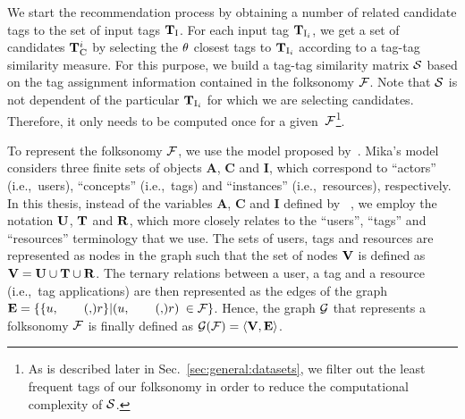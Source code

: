 We start the recommendation process by obtaining a number of related candidate tags to the set of input tags $\mathbf{T}_{\text{I}}$. 
For each input tag $\mathbf{T}_{\text{I}_i}$, we get a set of candidates $\mathbf{T}_{\text{C}}^i$ by selecting the $\theta$ closest tags to $\mathbf{T}_{\text{I}_i}$ according to a tag-tag similarity measure. For this purpose, we build a tag-tag similarity matrix $\mathcal{S}$ based on the tag assignment information contained in the folksonomy $\mathcal{F}$. Note that $\mathcal{S}$ is not dependent of the particular $\mathbf{T}_{\text{I}_i}$ for which we are selecting candidates. Therefore, it only needs to be computed once for a given~$\mathcal{F}$\footnote{As is described later in Sec.~\ref{sec:general:datasets}, we filter out the least frequent tags of our folksonomy in order to reduce the computational complexity of $\mathcal{S}$.}. 

To represent the folksonomy $\mathcal{F}$, we use the model proposed by~\cite{Mika2007a}. Mika's model considers three finite sets of objects $\mathbf{A}$, $\mathbf{C}$ and $\mathbf{I}$, which correspond to ``actors'' (i.e.,~users), ``concepts'' (i.e.,~tags) and ``instances'' (i.e.,~resources), respectively. In this thesis, instead of the variables $\mathbf{A}$, $\mathbf{C}$ and $\mathbf{I}$ defined by ~\cite{Mika2007a}, we employ the notation $\mathbf{U}$, $\mathbf{T}$ and $\mathbf{R}$, which more closely relates to the ``users'', ``tags'' and ``resources'' terminology that we use.
The sets of users, tags and resources are represented as nodes in the graph such that the set of nodes $\mathbf{V}$ is defined as $\mathbf{V}=\mathbf{U}\cup \mathbf{T}\cup \mathbf{R}$. The ternary relations between a user, a tag and a resource (i.e.,~tag applications) are then represented as the edges of the graph $\edges=\{\{\user,\tag,\resource\}| (\user,\tag,\resource)$ $\in \mathcal{F}\}$. Hence, the graph $\mathcal{G}$ that represents a folksonomy $\mathcal{F}$ is finally defined as $\mathcal{G}(\mathcal{F})=\left\langle \mathbf{V},\mathbf{E} \right\rangle$. 

